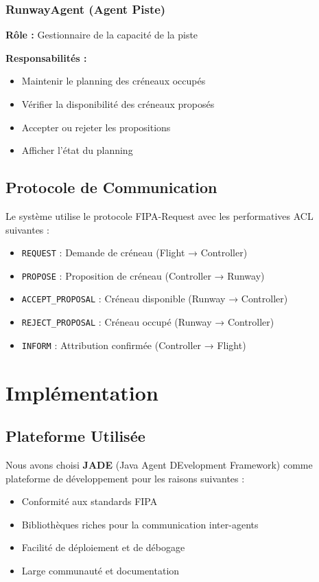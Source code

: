\documentclass[12pt,a4paper]{article}
\begin{document}
\subsubsection{RunwayAgent (Agent Piste)}
\textbf{Rôle :} Gestionnaire de la capacité de la piste

\textbf{Responsabilités :}
\begin{itemize}
    \item Maintenir le planning des créneaux occupés
    \item Vérifier la disponibilité des créneaux proposés
    \item Accepter ou rejeter les propositions
    \item Afficher l'état du planning
\end{itemize}

\subsection{Protocole de Communication}

Le système utilise le protocole FIPA-Request avec les performatives ACL suivantes :
\begin{itemize}
    \item \texttt{REQUEST} : Demande de créneau (Flight → Controller)
    \item \texttt{PROPOSE} : Proposition de créneau (Controller → Runway)
    \item \texttt{ACCEPT\_PROPOSAL} : Créneau disponible (Runway → Controller)
    \item \texttt{REJECT\_PROPOSAL} : Créneau occupé (Runway → Controller)
    \item \texttt{INFORM} : Attribution confirmée (Controller → Flight)
\end{itemize}

\section{Implémentation}

\subsection{Plateforme Utilisée}

Nous avons choisi \textbf{JADE} (Java Agent DEvelopment Framework) comme plateforme de développement pour les raisons suivantes :
\begin{itemize}
    \item Conformité aux standards FIPA
    \item Bibliothèques riches pour la communication inter-agents
    \item Facilité de déploiement et de débogage
    \item Large communauté et documentation
\end{itemize}
\end{document}
